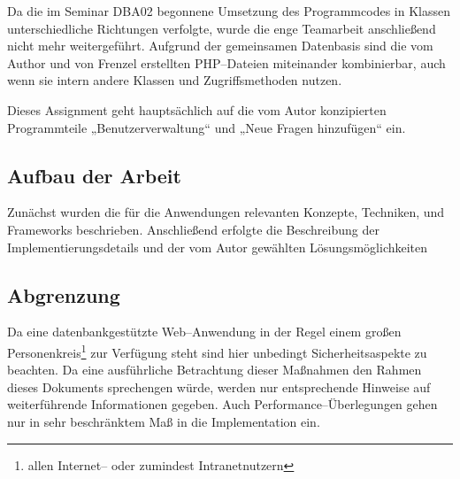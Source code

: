 Da die im Seminar DBA02 begonnene Umsetzung des Programmcodes in Klassen unterschiedliche Richtungen verfolgte, wurde die enge Teamarbeit anschließend nicht mehr weitergeführt. Aufgrund der gemeinsamen Datenbasis sind die vom Author und von Frenzel erstellten PHP--Dateien miteinander kombinierbar, auch wenn sie intern andere Klassen und Zugriffsmethoden nutzen.

Dieses Assignment geht hauptsächlich auf die vom Autor konzipierten Programmteile „Benutzerverwaltung“ und „Neue Fragen hinzufügen“ ein.

\subsection{Aufbau der Arbeit}

Zunächst wurden die für die Anwendungen relevanten Konzepte, Techniken, und Frameworks beschrieben. Anschließend erfolgte die Beschreibung der Implementierungsdetails und der vom Autor gewählten Lösungsmöglichkeiten  

\subsection{Abgrenzung}

Da eine datenbankgestützte Web--Anwendung in der Regel einem großen Personenkreis\footnote{allen Internet-- oder zumindest Intranetnutzern} zur Verfügung steht sind hier unbedingt Sicherheitsaspekte zu beachten. Da eine ausführliche Betrachtung dieser Maßnahmen den Rahmen dieses Dokuments sprechengen würde, werden nur entsprechende Hinweise auf weiterführende Informationen gegeben. Auch Performance--Überlegungen gehen nur in sehr beschränktem Maß in die Implementation ein.
